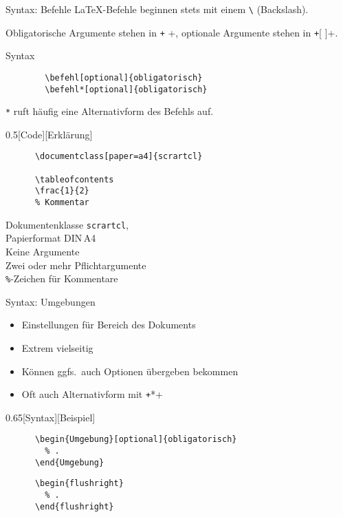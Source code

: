 \begin{frame}[fragile]{Syntax: Befehle}
  \LaTeX-Befehle beginnen stets mit einem \verb+\+ (Backslash).

  Obligatorische Argumente stehen in \texttt+{ }+, optionale Argumente stehen in \texttt+[ ]+.
    \begin{block}{Syntax}
      \begin{verbatim}
        \befehl[optional]{obligatorisch}
        \befehl*[optional]{obligatorisch}
      \end{verbatim}
    \end{block}

  \verb+*+ ruft häufig eine Alternativform des Befehls auf.
  \begin{CodeExplanation}{0.5}[Code][Erklärung]
    \begin{verbatim}
      \documentclass[paper=a4]{scrartcl}

      \tableofcontents
      \frac{1}{2}
      % Kommentar
    \end{verbatim}
  \Explanation
    \strut
    Dokumentenklasse \texttt{scrartcl},\\
    Papierformat DIN\,A4 \\
    Keine Argumente \\
    Zwei oder mehr Pflichtargumente\\
    \verb+%+-Zeichen für Kommentare
  \end{CodeExplanation}
\end{frame}

\begin{frame}[fragile]{Syntax: Umgebungen}
  \begin{itemize}
    \item Einstellungen für Bereich des Dokuments
    \item Extrem vielseitig
    \item Können ggfs.\ auch Optionen übergeben bekommen
    \item Oft auch Alternativform mit \texttt+*+
  \end{itemize}
  \begin{CodeExplanation}{0.65}[Syntax][Beispiel]
    \begin{verbatim}
      \begin{Umgebung}[optional]{obligatorisch}
        % .
      \end{Umgebung}
    \end{verbatim}
    \Explanation
    \begin{verbatim}
      \begin{flushright}
        % .
      \end{flushright}
    \end{verbatim}
  \end{CodeExplanation}
\end{frame}

